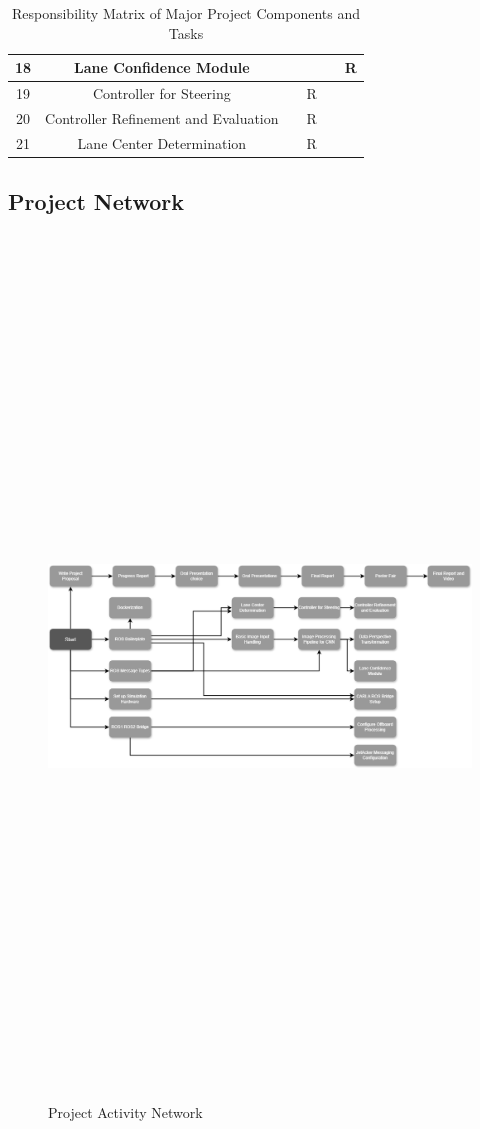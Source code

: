 \documentclass[titlepage, draft]{article}
\begin{document}
\begin{table}[H]
\begin{tabular}{|c | c | c | c | c | c |}
		\hline
		18   & Lane Confidence Module               &        &      &     & R      \\
		\hline
		19   & Controller for Steering              &        & R    &     &        \\
		\hline
		20   & Controller Refinement and Evaluation &        & R    &     &        \\
		\hline
		21   & Lane Center Determination            &        & R    &     &        \\
		\hline
	\end{tabular}
	\caption{Responsibility Matrix of Major Project Components and Tasks}
	\label{tab:WorkBreakdown}
\end{table}

\subsection{Project Network}

\begin{figure}[H]
	\centering
	\includegraphics[angle=90,height=9in]{activity}
	\caption{Project Activity Network}
	\label{fig:activity}
\end{figure}
\end{document}
